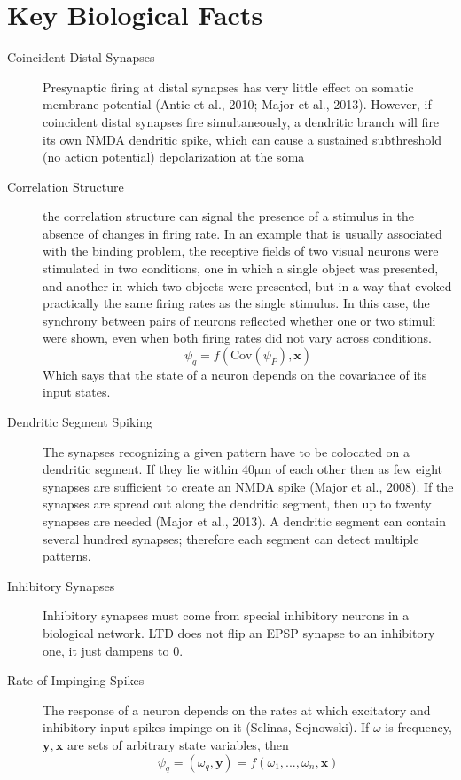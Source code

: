 \documentclass[11pt, a4paper]{article}
\begin{document}
\section{Key Biological Facts}
\begin{description}
    \item[Coincident Distal Synapses] Presynaptic firing at distal synapses has very little effect on somatic membrane potential (Antic et al., 2010; Major et al., 2013). However, if coincident distal synapses fire simultaneously, a dendritic branch will fire its own NMDA dendritic spike, which can cause a sustained subthreshold (no action potential) depolarization at the soma 
    
    \item[Correlation Structure] the correlation structure can signal the presence of a stimulus in the absence of changes in firing rate. In an example that is usually associated with the binding problem, the receptive fields of two visual neurons were stimulated in two conditions, one in which a single object was presented, and another in which two objects were presented, but in a way that evoked practically the same firing rates as the single stimulus. In this case, the synchrony between pairs of neurons reflected whether one or two stimuli were shown, even when both firing rates did not vary across conditions.
    \begin{equation}
        \psi_q = f(\mathrm{Cov}(\psi_P), \mathbf{x}) 
    \end{equation}
    Which says that the state of a neuron depends on the covariance of its input states.

    \item[Dendritic Segment Spiking] The synapses recognizing a given pattern have to be colocated on a dendritic segment. If they lie within 40$\mathrm{\mu}$m of each other then as few eight synapses are sufficient to create an NMDA spike (Major et al., 2008). If the synapses are spread out along the dendritic segment, then up to twenty synapses are needed (Major et al., 2013). A dendritic segment can contain several hundred synapses; therefore each segment can detect multiple patterns.

    \item[Inhibitory Synapses] Inhibitory synapses must come from special inhibitory neurons in a biological network. LTD does not flip an EPSP synapse to an inhibitory one, it just dampens to 0.
    
    \item[Rate of Impinging Spikes] The response of a neuron depends on the rates at which excitatory and inhibitory input spikes impinge on it (Selinas, Sejnowski). If $\omega$ is frequency, $\mathbf{y}, \mathbf{x}$ are sets of arbitrary state variables, then
    \begin{equation}
       \psi_q =  (\omega_q, \mathbf{y}) =  f(\omega_1, ...,\omega_n, \mathbf{x})
    \end{equation}


\end{description}
\end{document}
